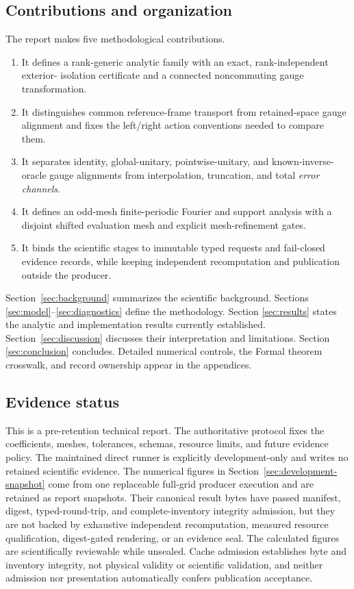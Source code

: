 \documentclass[11pt]{article}
\begin{document}
\subsection{Contributions and organization}

The report makes five methodological contributions.

\begin{enumerate}[label=(\roman*)]
\item It defines a rank-generic analytic family with an exact, rank-independent exterior-
isolation certificate and a connected noncommuting gauge transformation.
\item It distinguishes common reference-frame transport from retained-space gauge
alignment and fixes the left/right action conventions needed to compare them.
\item It separates identity, global-unitary, pointwise-unitary, and known-inverse-oracle
gauge alignments from interpolation, truncation, and total \emph{error channels}.
\item It defines an odd-mesh finite-periodic Fourier and support analysis with a disjoint
shifted evaluation mesh and explicit mesh-refinement gates.
\item It binds the scientific stages to immutable typed requests and fail-closed evidence
records, while keeping independent recomputation and publication outside the producer.
\end{enumerate}

Section~\ref{sec:background} summarizes the scientific background. Sections
\ref{sec:model}--\ref{sec:diagnostics} define the methodology. Section
\ref{sec:results} states the analytic and implementation results currently established.
Section~\ref{sec:discussion} discusses their interpretation and limitations. Section
\ref{sec:conclusion} concludes. Detailed numerical controls, the Formal theorem
crosswalk, and record ownership appear in the appendices.

\subsection{Evidence status}

This is a pre-retention technical report. The authoritative protocol fixes the
coefficients, meshes, tolerances, schemas, resource limits, and future evidence policy.
The maintained direct runner is explicitly development-only and writes no retained
scientific evidence. The numerical figures in Section~\ref{sec:development-snapshot}
come from one replaceable full-grid producer execution and are retained as report
snapshots. Their canonical result bytes have passed manifest, digest, typed-round-trip,
and complete-inventory integrity admission, but they are not backed by exhaustive
independent recomputation, measured resource qualification, digest-gated rendering, or
an evidence seal. The calculated figures are scientifically reviewable while unsealed.
Cache admission establishes byte and inventory integrity, not physical validity or
scientific validation, and neither admission nor presentation automatically confers
publication acceptance.
\end{document}
